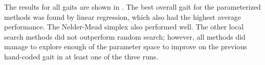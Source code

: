 

The results for all gaits are shown in
.  The best overall gait for
the parameterized methods was found by linear regression, which also
had the highest average performance. The Nelder-Mead simplex also
performed well.  The other local search methods did not
outperform random search; however, all methods did manage to explore
enough of the parameter space to improve on the previous
hand-coded gait in at least one of the three runs.
%



% 
% 
% 


